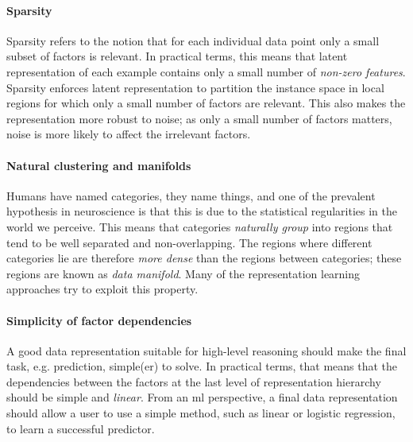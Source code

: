 \paragraph{\textbf{Sparsity}}
Sparsity refers to the notion that for each individual data point only a small subset of factors is relevant.
In practical terms, this means that latent representation of each example contains only a small number of \textit{non-zero features}.
Sparsity enforces latent representation to partition the instance space in local regions for which only a small number of factors are relevant.
This also makes the representation more robust to noise; as only a small number of factors matters, noise is more likely to affect the irrelevant factors.




\paragraph{\textbf{Natural clustering and manifolds}}
Humans have named categories, they name things, and one of the prevalent hypothesis in neuroscience is that this is due to the statistical regularities in the world we perceive.
This means that categories \textit{naturally group} into regions that tend to be well separated and non-overlapping.
The regions where different categories lie are therefore \textit{more dense} than the regions between categories; these regions are known as \textit{data manifold}.
Many of the representation learning approaches try to exploit this property.





\paragraph{\textbf{Simplicity of factor dependencies}}
A good data representation suitable for high-level reasoning should make the final task, e.g. prediction, simple(er) to solve.
In practical terms, that means that the dependencies between the factors at the last level of representation hierarchy should be simple and \textit{linear}.
From an \gls{ml} perspective, a final data representation should allow a user to use a simple method, such as linear or logistic regression, to learn a successful predictor.












